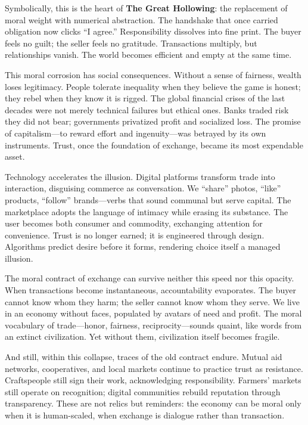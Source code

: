 \documentclass[11pt,twoside]{book}
\begin{document}
Symbolically, this is the heart of \textbf{The Great Hollowing}: the replacement of moral weight with numerical abstraction.  The handshake that once carried obligation now clicks “I agree.”  Responsibility dissolves into fine print.  The buyer feels no guilt; the seller feels no gratitude.  Transactions multiply, but relationships vanish.  The world becomes efficient and empty at the same time.

This moral corrosion has social consequences.  Without a sense of fairness, wealth loses legitimacy.  People tolerate inequality when they believe the game is honest; they rebel when they know it is rigged.  The global financial crises of the last decades were not merely technical failures but ethical ones.  Banks traded risk they did not bear; governments privatized profit and socialized loss.  The promise of capitalism—to reward effort and ingenuity—was betrayed by its own instruments.  Trust, once the foundation of exchange, became its most expendable asset.

Technology accelerates the illusion.  Digital platforms transform trade into interaction, disguising commerce as conversation.  We “share” photos, “like” products, “follow” brands—verbs that sound communal but serve capital.  The marketplace adopts the language of intimacy while erasing its substance.  The user becomes both consumer and commodity, exchanging attention for convenience.  Trust is no longer earned; it is engineered through design.  Algorithms predict desire before it forms, rendering choice itself a managed illusion.

The moral contract of exchange can survive neither this speed nor this opacity.  When transactions become instantaneous, accountability evaporates.  The buyer cannot know whom they harm; the seller cannot know whom they serve.  We live in an economy without faces, populated by avatars of need and profit.  The moral vocabulary of trade—honor, fairness, reciprocity—sounds quaint, like words from an extinct civilization.  Yet without them, civilization itself becomes fragile.

And still, within this collapse, traces of the old contract endure.  Mutual aid networks, cooperatives, and local markets continue to practice trust as resistance.  Craftspeople still sign their work, acknowledging responsibility.  Farmers’ markets still operate on recognition; digital communities rebuild reputation through transparency.  These are not relics but reminders: the economy can be moral only when it is human-scaled, when exchange is dialogue rather than transaction.
\end{document}
